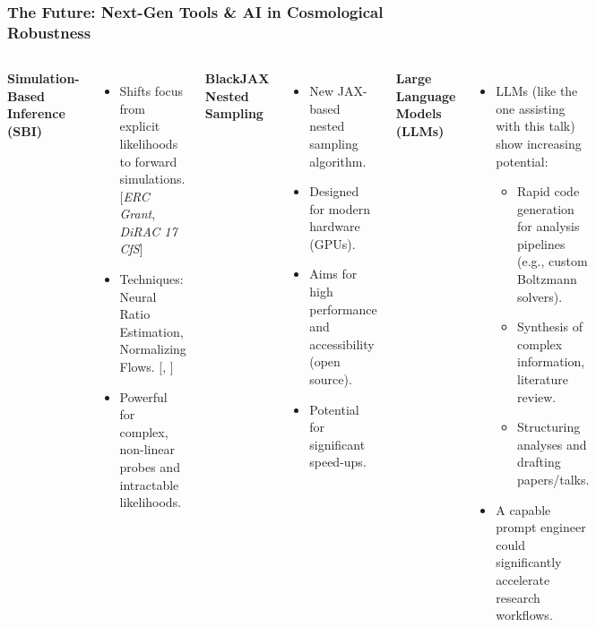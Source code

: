 \documentclass[aspectratio=169]{beamer}
\begin{document}
\begin{frame}
    \frametitle{The Future: Next-Gen Tools & AI in Cosmological Robustness}
    \begin{columns}[T]
        \textbf{Simulation-Based Inference (SBI)}
        \begin{itemize}
            \item Shifts focus from explicit likelihoods to forward simulations. [\textit{ERC Grant}, \textit{DiRAC 17 CfS}]
            \item Techniques: Neural Ratio Estimation, Normalizing Flows. [, ]
            \item Powerful for complex, non-linear probes and intractable likelihoods.
        \end{itemize}
        \vspace{1em}
        \textbf{BlackJAX Nested Sampling}
        \begin{itemize}
            \item New JAX-based nested sampling algorithm.
            \item Designed for modern hardware (GPUs).
            \item Aims for high performance and accessibility (open source).
            \item Potential for significant speed-ups.
        \end{itemize}
        \vspace{1em}
        \textbf{Large Language Models (LLMs)}
        \begin{itemize}
            \item LLMs (like the one assisting with this talk) show increasing potential:
                \begin{itemize}
                    \item Rapid code generation for analysis pipelines (e.g., custom Boltzmann solvers).
                    \item Synthesis of complex information, literature review.
                    \item Structuring analyses and drafting papers/talks.
                \end{itemize}
            \item A capable prompt engineer could significantly accelerate research workflows.
        \end{itemize}


\end{columns}
\end{frame}
\end{document}
